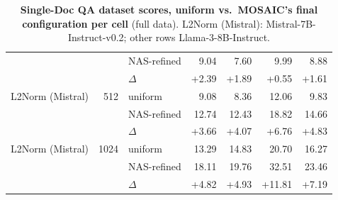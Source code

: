 \begin{table}[tp]
\begin{tabular}{@{}l r l r r r r @{}}
     &  & NAS-refined & 9.04 & 7.60 & 9.99 & 8.88 \\
     &  & $\Delta$ & +2.39 & +1.89 & +0.55 & +1.61 \\
    \midrule
    L2Norm (Mistral) & 512 & uniform & 9.08 & 8.36 & 12.06 & 9.83 \\
     &  & NAS-refined & 12.74 & 12.43 & 18.82 & 14.66 \\
     &  & $\Delta$ & +3.66 & +4.07 & +6.76 & +4.83 \\
    \midrule
    L2Norm (Mistral) & 1024 & uniform & 13.29 & 14.83 & 20.70 & 16.27 \\
     &  & NAS-refined & 18.11 & 19.76 & 32.51 & 23.46 \\
     &  & $\Delta$ & +4.82 & +4.93 & +11.81 & +7.19 \\
    \bottomrule
  \end{tabular}
  \caption{\textbf{Single-Doc QA dataset scores, uniform vs.\ MOSAIC's final configuration per cell} (full data). L2Norm (Mistral): Mistral-7B-Instruct-v0.2; other rows Llama-3-8B-Instruct.}
  \label{tab:app-lb-SINGLE_DOCUMENT_QA}
\end{table}

